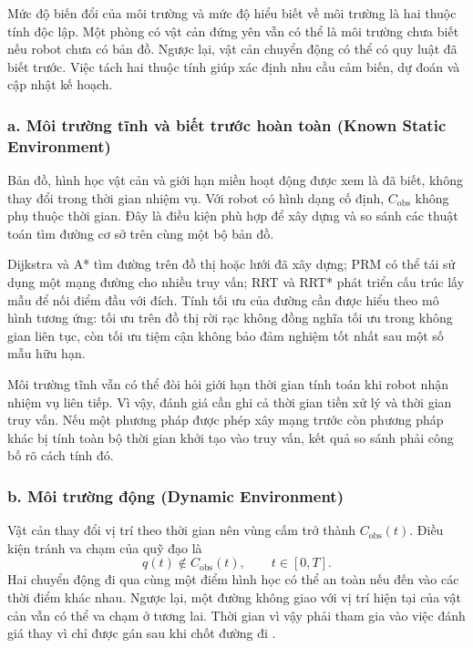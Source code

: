 \documentclass[12pt,a4paper,oneside]{report}
\begin{document}
Mức độ biến đổi của môi trường và mức độ hiểu biết về môi trường là hai thuộc tính độc lập. Một phòng có vật cản đứng yên vẫn có thể là môi trường chưa biết nếu robot chưa có bản đồ. Ngược lại, vật cản chuyển động có thể có quy luật đã biết trước. Việc tách hai thuộc tính giúp xác định nhu cầu cảm biến, dự đoán và cập nhật kế hoạch.

\subsubsection*{a. Môi trường tĩnh và biết trước hoàn toàn (Known Static Environment)}

Bản đồ, hình học vật cản và giới hạn miền hoạt động được xem là đã biết, không thay đổi trong thời gian nhiệm vụ. Với robot có hình dạng cố định, \(C_{\mathrm{obs}}\) không phụ thuộc thời gian. Đây là điều kiện phù hợp để xây dựng và so sánh các thuật toán tìm đường cơ sở trên cùng một bộ bản đồ.

Dijkstra và A* tìm đường trên đồ thị hoặc lưới đã xây dựng; PRM có thể tái sử dụng một mạng đường cho nhiều truy vấn; RRT và RRT* phát triển cấu trúc lấy mẫu để nối điểm đầu với đích. Tính tối ưu của đường cần được hiểu theo mô hình tương ứng: tối ưu trên đồ thị rời rạc không đồng nghĩa tối ưu trong không gian liên tục, còn tối ưu tiệm cận không bảo đảm nghiệm tốt nhất sau một số mẫu hữu hạn.

Môi trường tĩnh vẫn có thể đòi hỏi giới hạn thời gian tính toán khi robot nhận nhiệm vụ liên tiếp. Vì vậy, đánh giá cần ghi cả thời gian tiền xử lý và thời gian truy vấn. Nếu một phương pháp được phép xây mạng trước còn phương pháp khác bị tính toàn bộ thời gian khởi tạo vào truy vấn, kết quả so sánh phải công bố rõ cách tính đó.

\subsubsection*{b. Môi trường động (Dynamic Environment)}

Vật cản thay đổi vị trí theo thời gian nên vùng cấm trở thành \(C_{\mathrm{obs}}(t)\). Điều kiện tránh va chạm của quỹ đạo là
\[
  q(t)\notin C_{\mathrm{obs}}(t),\qquad t\in[0,T].
\]
Hai chuyển động đi qua cùng một điểm hình học có thể an toàn nếu đến vào các thời điểm khác nhau. Ngược lại, một đường không giao với vị trí hiện tại của vật cản vẫn có thể va chạm ở tương lai. Thời gian vì vậy phải tham gia vào việc đánh giá thay vì chỉ được gán sau khi chốt đường đi \cite{lavalle-planning-2006}.
\end{document}
